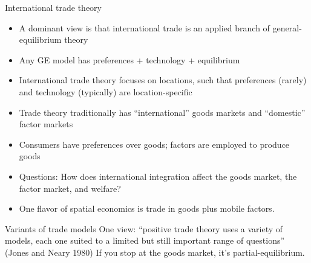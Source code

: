 \documentclass[10pt,notes=hide]{beamer}
\begin{document}
\begin{frame}{International trade theory}
\begin{itemize}
	\item A dominant view is that international trade is an applied branch of general-equilibrium theory
	\item Any GE model has preferences + technology + equilibrium
	\item International trade theory focuses on locations, such that preferences (rarely) and technology (typically) are location-specific
	\item Trade theory traditionally has ``international'' goods markets and ``domestic'' factor markets
	\item Consumers have preferences over goods; factors are employed to produce goods
	\item Questions: How does international integration affect the goods market, the factor market, and welfare?
	\item One flavor of spatial economics is trade in goods plus mobile factors.
\end{itemize}
\end{frame}
\begin{frame}{Variants of trade models}
One view: ``positive trade theory uses a variety of models, each one suited to a limited but still important range of questions''
{\small (Jones and Neary 1980)}
\bigskip
{}
\bigskip
If you stop at the goods market, it's partial-equilibrium.
\end{frame}
\end{document}
